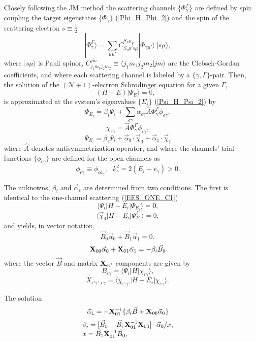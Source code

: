 \documentclass[aip
, pra
, showpacs
, aps
, twocolumn
, groupedaddress
, floatfix
]{revtex4}
\newcommand{\beq}{\begin{equation}}
\newcommand{\eeq}{\end{equation}}
\newcommand{\barr}{\begin{array}}
\newcommand{\earr}{\end{array}}
\begin{document}
Closely following the JM method \cite{BR76p1491, KFB11} the scattering channels $\{\Phi_\gamma^\Gamma\}$ are defined by spin coupling the target eigenstates
$\{\Phi_\gamma\}$ (\ref{Phi_H_Phi_2})
and the spin of the scattering electron
$s\equiv \frac{1}{2}$
\beq
| \Phi_{\gamma}^{\Gamma} \rangle = \sum_{\mu \mu'}
C_{S_\gamma \mu' s \mu}^{S_\Gamma \mu_\Gamma}
|\Phi_{\gamma \mu'} \rangle \ |s \mu  \rangle,
\label{chi_phi_Gamma} \eeq
where $|s \mu \rangle$ is Pauli spinor,
$C_{j_1m_1j_2m_2}^{jm} \equiv \langle j_1m_1 j_2 m_2| jm\rangle$ are the Clebsch-Gordan coefficients,
and where each scattering channel is labeled by a $\{\gamma, \Gamma\}$-pair.
Then, the solution of the $(\mathcal{N}+1)$-electron Schr\"odinger equation for a given $\Gamma$,
\beq
(H-E) | \Psi_E \rangle =0,  \ \ \  \label{H_E_Psi_E_2}
\eeq
is approximated at the system's eigenvalues $\{E_i\}$ (\ref{Psi_H_Psi_2}) by
\beq 
 \Psi_{E_i}  =  \beta_i \Psi_i
+ \sum_{\epsilon \gamma}   \alpha_{\epsilon \gamma}
\hat{A} \Phi^\Gamma_{\gamma}  \phi_{\epsilon \gamma} ,
\eeq
\beq
\chi_{\epsilon \gamma} = \hat{A} \Phi^\Gamma_{\gamma}  \phi_{\epsilon \gamma},
\eeq
\beq
 \Psi_{E_i}  =  \beta_i \Psi_i
+ \vec{\alpha}_0 \cdot \vec{\chi}_0 + \vec{\alpha}_1 \cdot \vec{\chi}_1
\eeq
where $\hat{A}$ denotes antisymmetrization operator,
and where the channels' trial functions $\{ \phi_{\epsilon \gamma} \}$ are defined for the open channels as
\beq
\phi_{\epsilon \gamma}\equiv \phi_{\epsilon k_\gamma}, \ \ \   k_{\gamma}^2 = 2(E_i - e_\gamma) > 0.
\eeq


The unknowns, $\beta_i$ and $\vec{\alpha}_\epsilon$ are determined from two conditions. The first is identical to the one-channel scattering (\ref{EES_ONE_C1})
\beq
\langle\Psi_i|H-E_i|\Psi_{E_i}\rangle=0,
\label{EES_MC_C1} \eeq  %
\beq
\langle \vec{\chi}_{0} |H-E_i|\Psi_{E_i}^{\Gamma}\rangle=0,
\label{EES_MC_C2} \eeq  %
and yields, in vector notation,
\beq
\vec{B}_0 \vec{\alpha}_0 + \vec{B}_1 \vec{\alpha}_1 = 0, \label{CK_s}
\eeq
\beq
{\bf X}_{00} \vec{\alpha}_0 + {\bf X}_{01} \vec{\alpha}_1 = - \beta_i \vec{B}_0
\eeq
where the vector $\vec{B}$ and matrix ${\bf X}_{\epsilon\epsilon'}$ components are given by
\beq
B_{\epsilon \gamma}
= \langle \Psi_i |H| \chi_{\epsilon \gamma} \rangle,
\eeq
\beq
X_{\epsilon' \gamma', \epsilon \gamma} = \langle \chi_{\epsilon' \gamma'}  | H-E_i |
\chi_{\epsilon \gamma} \rangle,
\label{Y_B_W} \eeq


The solution 
\beq
\vec{\alpha}_1= - {\bf X}_{01}^{-1} \{ \beta_i \vec{B} + {\bf X}_{00} \vec{\alpha}_0 \}
\eeq
\beq \barr{l}
\beta_i = [ \vec{B}_0 - \vec{B}_1 {\bf X}_{01}^{-1} {\bf X}_{00} ] \cdot \vec{\alpha}_0 / x ,\\
x = \vec{B}_1 {\bf X}_{01}^{-1} \vec{B}_0,
\earr \eeq
\end{document}
